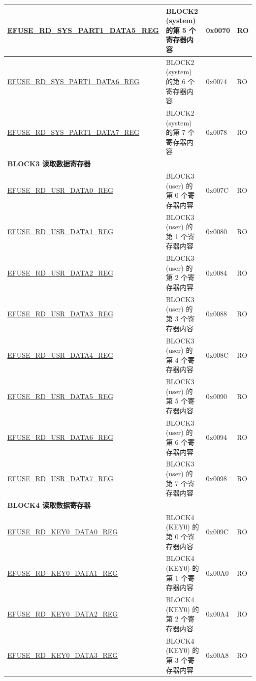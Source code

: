 \begin{longtable}{ | p{7cm} | p{7.2cm} | p{1.3cm} | p{1cm} | }
\hyperref[regdesc:EFUSERDSYSPART1DATA4TO7REG]{EFUSE\_RD\_SYS\_PART1\_DATA5\_REG} & BLOCK2 (system) 的第 5 个寄存器内容 & 0x0070 & RO \\ \hline
\hyperref[regdesc:EFUSERDSYSPART1DATA4TO7REG]{EFUSE\_RD\_SYS\_PART1\_DATA6\_REG} & BLOCK2 (system) 的第 6 个寄存器内容 & 0x0074 & RO \\ \hline
\hyperref[regdesc:EFUSERDSYSPART1DATA4TO7REG]{EFUSE\_RD\_SYS\_PART1\_DATA7\_REG} & BLOCK2 (system) 的第 7 个寄存器内容 & 0x0078 & RO \\ \hline
\multicolumn{4}{|l|}{\textbf{BLOCK3 读取数据寄存器}} \\ \hline
\hyperref[regdesc:EFUSERDUSRDATANREG]{EFUSE\_RD\_USR\_DATA0\_REG} & BLOCK3 (user) 的第 0 个寄存器内容 & 0x007C & RO \\ \hline
\hyperref[regdesc:EFUSERDUSRDATANREG]{EFUSE\_RD\_USR\_DATA1\_REG} & BLOCK3 (user) 的第 1 个寄存器内容 & 0x0080 & RO \\ \hline
\hyperref[regdesc:EFUSERDUSRDATANREG]{EFUSE\_RD\_USR\_DATA2\_REG} & BLOCK3 (user) 的第 2 个寄存器内容 & 0x0084 & RO \\ \hline
\hyperref[regdesc:EFUSERDUSRDATANREG]{EFUSE\_RD\_USR\_DATA3\_REG} & BLOCK3 (user) 的第 3 个寄存器内容 & 0x0088 & RO \\ \hline
\hyperref[regdesc:EFUSERDUSRDATANREG]{EFUSE\_RD\_USR\_DATA4\_REG} & BLOCK3 (user) 的第 4 个寄存器内容 & 0x008C & RO \\ \hline
\hyperref[regdesc:EFUSERDUSRDATANREG]{EFUSE\_RD\_USR\_DATA5\_REG} & BLOCK3 (user) 的第 5 个寄存器内容 & 0x0090 & RO \\ \hline
\hyperref[regdesc:EFUSERDUSRDATANREG]{EFUSE\_RD\_USR\_DATA6\_REG} & BLOCK3 (user) 的第 6 个寄存器内容 & 0x0094 & RO \\ \hline
\hyperref[regdesc:EFUSERDUSRDATANREG]{EFUSE\_RD\_USR\_DATA7\_REG} & BLOCK3 (user) 的第 7 个寄存器内容 & 0x0098 & RO \\ \hline
\multicolumn{4}{|l|}{\textbf{BLOCK4 读取数据寄存器}} \\ \hline
\hyperref[regdesc:EFUSERDKEY0DATANREG]{EFUSE\_RD\_KEY0\_DATA0\_REG} & BLOCK4 (KEY0) 的第 0 个寄存器内容 & 0x009C & RO \\ \hline
\hyperref[regdesc:EFUSERDKEY0DATANREG]{EFUSE\_RD\_KEY0\_DATA1\_REG} & BLOCK4 (KEY0) 的第 1 个寄存器内容 & 0x00A0 & RO \\ \hline
\hyperref[regdesc:EFUSERDKEY0DATANREG]{EFUSE\_RD\_KEY0\_DATA2\_REG} & BLOCK4 (KEY0) 的第 2 个寄存器内容 & 0x00A4 & RO \\ \hline
\hyperref[regdesc:EFUSERDKEY0DATANREG]{EFUSE\_RD\_KEY0\_DATA3\_REG} & BLOCK4 (KEY0) 的第 3 个寄存器内容 & 0x00A8 & RO \\ \hline

\end{longtable}
